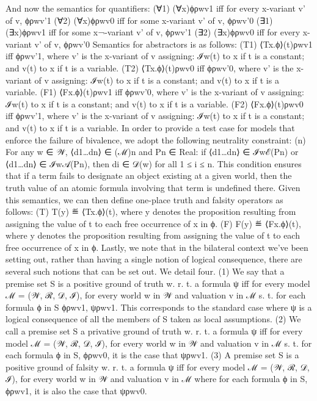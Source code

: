 \documentclass[]{article}
\begin{document}
And now the semantics for quantifiers: 
(∀1)	(∀x)ϕρwv1 iff for every x-variant v’ of v, ϕρwv’1
(∀2)	(∀x)ϕρwv0 iff for some x-variant v’ of v, ϕρwv’0 
(∃1)	(∃x)ϕρwv1 iff for some x¬-variant v’ of v, ϕρwv’1
(∃2)	(∃x)ϕρwv0 iff for every x-variant v’ of v, ϕρwv’0
Semantics for abstractors is as follows:
(T1)	⟨Tx.ϕ⟩(t)ρwv1 iff ϕρwv’1, where v’ is the x-variant of v assigning: ℐw(t) to x if t is a constant; and v(t) to x if t is a variable. 
(T2)	⟨Tx.ϕ⟩(t)ρwv0 iff ϕρwv’0, where v’ is the x-variant of v assigning: ℐw(t) to x if t is a constant; and v(t) to x if t is a variable.
(F1)	⟨Fx.ϕ⟩(t)ρwv1 iff ϕρwv’0, where v’ is the x-variant of v assigning: ℐw(t) to x if t is a constant; and v(t) to x if t is a variable.
(F2)	⟨Fx.ϕ⟩(t)ρwv0 iff ϕρwv’1, where v’ is the x-variant of v assigning: ℐw(t) to x if t is a constant; and v(t) to x if t is a variable.
In order to provide a test case for models that enforce the failure of bivalence, we adopt the following neutrality constraint:
(n)	For any w ∈ 𝒲, ⟨d1…dn⟩ ∈ (ℳ)n and Pn ∈ Real: if ⟨d1…dn⟩ ∈ ℐwℰ(Pn) or ⟨d1…dn⟩ ∈ ℐw𝒜(Pn), then di ∈ 𝒟(w) for all 1 ≤ i ≤ n.
This condition ensures that if a term fails to designate an object existing at a given world, then the truth value of an atomic formula involving that term is undefined there. 
Given this semantics, we can then define one-place truth and falsity operators as follows: 
(T)	T(y) ≝ ⟨Tx.ϕ⟩(t), where y denotes the proposition resulting from assigning the value of t to each free occurrence of x in ϕ.
(F)	F(y) ≝ ⟨Fx.ϕ⟩(t), where y denotes the proposition resulting from assigning the value of t to each free occurrence of x in ϕ.
Lastly, we note that in the bilateral context we’ve been setting out, rather than having a single notion of logical consequence, there are several such notions that can be set out. We detail four. 
(1)	We say that a premise set S is a positive ground of truth  w. r. t. a formula ψ iff for every model ℳ = (𝒲, ℛ, 𝒟, ℐ), for every world w in 𝒲 and valuation v in ℳ s. t. for each formula ϕ in S ϕρwv1, ψρwv1. This corresponds to the standard case where ψ is a logical consequence of all the members of S taken as local assumptions.
(2)	We call a premise set S a privative ground of truth w. r. t. a formula ψ iff for every model ℳ = (𝒲, ℛ, 𝒟, ℐ), for every world w in 𝒲 and valuation v in ℳ s. t. for each formula ϕ in S, ϕρwv0, it is the case that ψρwv1. 
(3)	A premise set S is a positive ground of falsity w. r. t. a formula ψ iff for every model ℳ = (𝒲, ℛ, 𝒟, ℐ), for every world w in 𝒲 and valuation v in ℳ where for each formula ϕ in S, ϕρwv1, it is also the case that ψρwv0.
\end{document}
